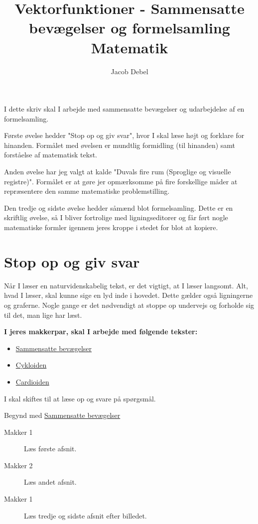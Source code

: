 \documentclass[a4paper, 12pt]{article}
\author{Jacob Debel}
\date{}
\title{Vektorfunktioner - Sammensatte bevægelser og formelsamling\\\medskip
\large Matematik}
\begin{document}
\maketitle
I dette skriv skal I arbejde med sammensatte bevægelser og udarbejdelse af en formelsamling. 

Første øvelse hedder "Stop op og giv svar", hvor I skal læse højt og forklare for hinanden. Formålet med øvelsen er mundtlig formidling (til hinanden) samt forståelse af matematisk tekst. 

Anden øvelse har jeg valgt at kalde "Duvals fire rum (Sproglige og visuelle registre)". Formålet er at gøre jer opmærksomme på fire forskellige måder at repræsentere den samme matematiske problemstilling. 

Den tredje og sidste øvelse hedder såmænd blot formelsamling. Dette er en skriftlig øvelse, så I bliver fortrolige med ligningseditorer og får ført nogle matematiske formler igennem jeres kroppe i stedet for blot at kopiere.
\section*{Stop op og giv svar}
\label{sec:org1ef9767}

Når I læser en naturvidenskabelig tekst, er det vigtigt, at I læser langsomt. Alt, hvad I læser, skal kunne sige en lyd inde i hovedet. Dette gælder også ligningerne og graferne. Nogle gange er det nødvendigt at stoppe op undervejs og forholde sig til det, man lige har læst.

\textbf{I jeres makkerpar, skal I arbejde med følgende tekster:}

\begin{itemize}
\item \href{https://matahtx.systime.dk/?id=365}{Sammensatte bevægelser}
\item \href{https://matahtx.systime.dk/?id=p366}{Cykloiden}
\item \href{https://matahtx.systime.dk/?id=p367}{Cardioiden}
\end{itemize}

I skal skiftes til at læse op og svare på spørgsmål.

Begynd med \href{https://matahtx.systime.dk/?id=365}{Sammensatte bevægelser}

\begin{description}
\item[{Makker 1}] Læs første afsnit.

\item[{Makker 2}] Læs andet afsnit.

\item[{Makker 1}] Læs tredje og sidste afsnit efter billedet.
\end{description}
\end{document}
